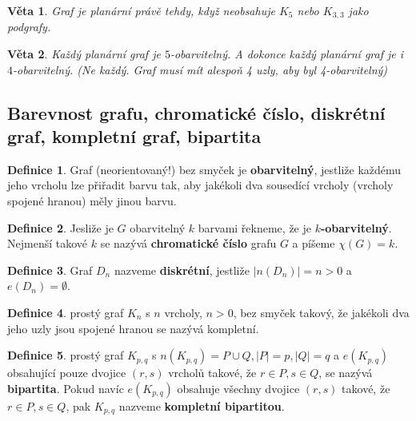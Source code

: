 \documentclass[a4]{report}
\newtheorem{theorem}{Věta}
\theoremstyle{definition}
\newtheorem{definition}{Definice}[section]
\begin{document}
\begin{theorem}
Graf je planární právě tehdy, když neobsahuje $K_5$ nebo $K_{3,3}$ jako podgrafy.
\end{theorem}

\begin{theorem}
Každý planární graf je $5$-obarvitelný. A dokonce každý planární graf je i $4$-obarvitelný. (Ne každý. Graf musí mít alespoň 4 uzly, aby byl 4-obarvitelný)
\end{theorem}

\subsection{Barevnost grafu, chromatické číslo, diskrétní graf, kompletní graf, bipartita}

\begin{definition}
Graf (neorientovaný!) bez smyček je \textbf{obarvitelný}, jestliže každému jeho vrcholu lze přiřadit barvu tak, aby jakékoli dva sousedící vrcholy (vrcholy spojené hranou) měly jinou barvu.
\end{definition}

\begin{definition}
Jesliže je $G$ obarvitelný $k$ barvami řekneme, že je \textbf{$k$-obarvitelný}. Nejmenší takové $k$ se nazývá \textbf{chromatické číslo} grafu $G$ a píšeme $\chi(G) = k$.
\end{definition}

\begin{definition}
Graf $D_n$ nazveme \textbf{diskrétní}, jestliže $|n(D_n)| = n > 0$ a $e(D_n) = \emptyset$. 
\end{definition}

\begin{definition}
prostý graf $K_n$ s $n$ vrcholy, $n >0$, bez smyček takový, že jakékoli dva jeho uzly jsou spojené hranou se nazývá kompletní.
\end{definition}

\begin{definition}
prostý graf $K_{p,q}$ s $n(K_{p,q}) = P \cup Q, |P| = p, |Q| = q$ a $e(K_{p,q})$ obsahující pouze dvojice $(r,s)$ vrcholů takové, že $r \in P, s \in Q$, se nazývá \textbf{bipartita}. Pokud navíc $e(K_{p,q})$ obsahuje všechny dvojice $(r,s)$ takové, že $r \in P, s \in Q$, pak $K_{p,q}$ nazveme \textbf{kompletní bipartitou}.
\end{definition}
\end{document}

